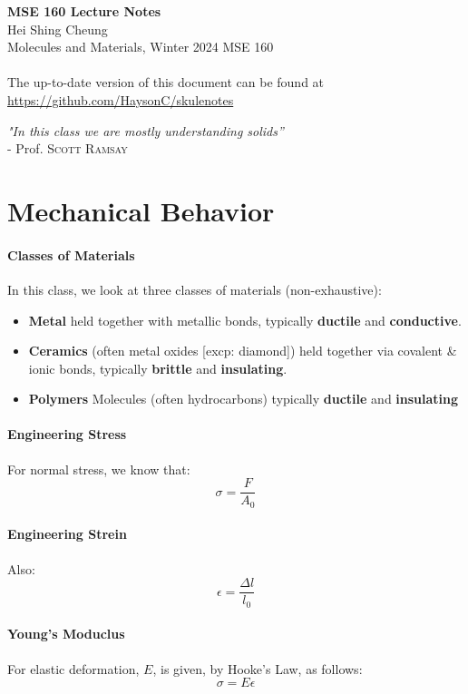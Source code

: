 \documentclass[11pt]{article}
\begin{document}
\thispagestyle{empty}
{\LARGE \bf MSE 160 Lecture Notes}\\
{\large Hei Shing Cheung}\\
Molecules and Materials, Winter 2024 \hfill MSE 160\\
\\
The up-to-date version of this document can be found at \url{https://github.com/HaysonC/skulenotes}\\
\begin{center}
\textit{"In this class we are mostly understanding solids''} \\ - Prof. \textsc{Scott Ramsay}
\end{center}
\vspace{10pt}
\section{Mechanical Behavior}
\paragraph{Classes of Materials} In this class, we look at three classes of materials (non-exhaustive):
\begin{itemize}
    \item \textbf{Metal} held together with metallic bonds, typically \textbf{ductile} and \textbf{conductive}.
    \item \textbf{Ceramics}  (often metal oxides [excp: diamond]) held together via covalent \& ionic bonds, typically \textbf{brittle} and \textbf{insulating}.
    \item \textbf{Polymers} Molecules (often hydrocarbons) typically \textbf{ductile} and \textbf{insulating}
\end{itemize}
\paragraph{Engineering Stress} For normal stress, we know that:
\begin{equation}
    \sigma = \frac{F}{A_0}
\end{equation}
\paragraph{Engineering Strein} Also:
\begin{equation}
    \epsilon = \frac{\Delta l}{l_0}
\end{equation}
\paragraph{Young's Moduclus} For elastic deformation, $E$, is given, by Hooke's Law, as follows:
\begin{equation}
    \sigma = E \epsilon
\end{equation}
\end{document}
